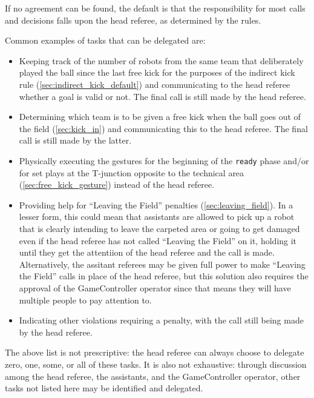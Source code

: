 If no agreement can be found, the default is that the responsibility for most
calls and decisions falls upon the head referee, as determined by the rules.

Common examples of tasks that can be delegated are:

\begin{itemize}
  \item Keeping track of the number of robots from the same team that deliberately played the ball
        since the last free kick for the purposes of the indirect kick rule (\cref{sec:indirect_kick_default})
        and communicating to the head referee whether a goal is valid or not.
        The final call is still made by the head referee.
  \item Determining which team is to be given a free kick when the ball goes
        out of the field (\cref{sec:kick_in}) and communicating this to the head referee.
        The final call is still made by the latter.
  \item Physically executing the gestures for the beginning of the \texttt{ready}
        phase and/or for set plays at the T-junction opposite to the technical area
        (\cref{sec:free_kick_gesture}) instead of the head referee.
  \item Providing help for ``Leaving the Field'' penalties (\cref{sec:leaving_field}). In a lesser form,
        this could mean that assistants are allowed to pick up a robot that is
        clearly intending to leave the carpeted area or going to get damaged
        even if the head referee has not called ``Leaving the Field'' on it,
        holding it until they get the attentiion of the head referee
        and the call is made.
        Alternatively, the assitant referees may be given full power to make
        ``Leaving the Field'' calls in place of the head referee, but this solution
        also requires the approval of the GameController operator since that means
        they will have multiple people to pay attention to.
  \item Indicating other violations requiring a penalty, with the call still
        being made by the head referee.
\end{itemize}

The above list is not prescriptive: the head referee can always choose to delegate
zero, one, some, or all of these tasks. It is also not exhaustive: through
discussion among the head referee, the assistants, and the GameController operator,
other tasks not listed here may be identified and delegated.

